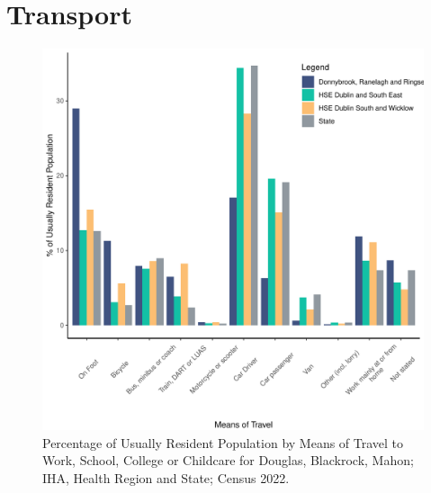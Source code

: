 \documentclass{article}
\begin{document}
\section{Transport}\label{sect:Trans}
\begin{figure}[H]
	\centering
	\includegraphics[width = 120mm]{../figures/TravelED.pdf}
	\caption{Percentage of Usually Resident Population by Means of Travel to Work, School, College or Childcare for Douglas, Blackrock, Mahon; IHA, Health Region and State; Census 2022.}
	\label{fig:vbnv}
	\end{figure}
\end{document}
